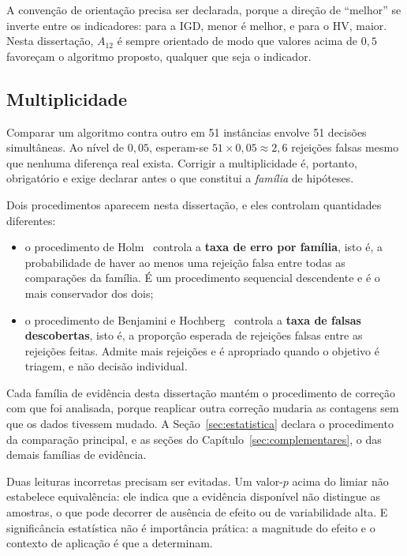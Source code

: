 A convenção de orientação precisa ser declarada, porque a direção de ``melhor'' se inverte entre os indicadores: para a IGD, menor é melhor, e para o HV, maior. Nesta dissertação, $A_{12}$ é sempre orientado de modo que valores acima de $0{,}5$ favoreçam o algoritmo proposto, qualquer que seja o indicador.

\subsection{Multiplicidade}

Comparar um algoritmo contra outro em 51 instâncias envolve 51 decisões simultâneas. Ao nível de $0{,}05$, esperam-se $51 \times 0{,}05 \approx 2{,}6$ rejeições falsas mesmo que nenhuma diferença real exista. Corrigir a multiplicidade é, portanto, obrigatório e exige declarar antes o que constitui a \emph{família} de hipóteses.

Dois procedimentos aparecem nesta dissertação, e eles controlam quantidades diferentes:

\begin{itemize}
\item o procedimento de Holm~\cite{holm1979simple} controla a \textbf{taxa de erro por família}, isto é, a probabilidade de haver ao menos uma rejeição falsa entre todas as comparações da família. É um procedimento sequencial descendente e é o mais conservador dos dois;
\item o procedimento de Benjamini e Hochberg~\cite{benjamini1995controlling} controla a \textbf{taxa de falsas descobertas}, isto é, a proporção esperada de rejeições falsas entre as rejeições feitas. Admite mais rejeições e é apropriado quando o objetivo é triagem, e não decisão individual.
\end{itemize}

Cada família de evidência desta dissertação mantém o procedimento de correção com que foi analisada, porque reaplicar outra correção mudaria as contagens sem que os dados tivessem mudado. A Seção~\ref{sec:estatistica} declara o procedimento da comparação principal, e as seções do Capítulo~\ref{sec:complementares}, o das demais famílias de evidência.

Duas leituras incorretas precisam ser evitadas. Um valor-$p$ acima do limiar não estabelece equivalência: ele indica que a evidência disponível não distingue as amostras, o que pode decorrer de ausência de efeito ou de variabilidade alta. E significância estatística não é importância prática: a magnitude do efeito e o contexto de aplicação é que a determinam.

